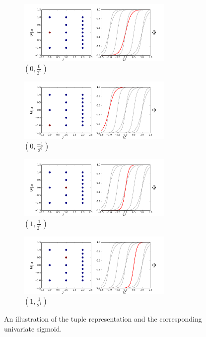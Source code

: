 \begin{figure}[htbp]\begin{center}
    \begin{subfigure}[t]{.48\textwidth}
        \centering
        \includegraphics[width=7.5cm]{../basis_0.png}
        \caption{$\left(0,\frac{0}{2^0}\right)$}
        \label{fig: basis 0}
    \end{subfigure}
    \begin{subfigure}[t]{.48\textwidth}
        \centering
        \includegraphics[width=7.5cm]{../basis_1.png}
        \caption{$\left(0, \frac{-1}{2^0}\right)$}
        \label{fig: basis 1}
    \end{subfigure}
    \begin{subfigure}[t]{.48\textwidth}
        \centering
        \includegraphics[width=7.5cm]{../basis_3.png}
        \caption{$\left(1, \frac{1}{2^0}\right)$}
        \label{fig: basis 2}
    \end{subfigure}
    \begin{subfigure}[t]{.48\textwidth}
        \centering
        \includegraphics[width=7.5cm]{../basis_6.png}
        \caption{$\left(1, \frac{1}{2^1}\right)$}
        \label{fig: basis 3}
    \end{subfigure}
    \caption{An illustration of the tuple representation and the corresponding univariate sigmoid.}
\end{center}\end{figure}

